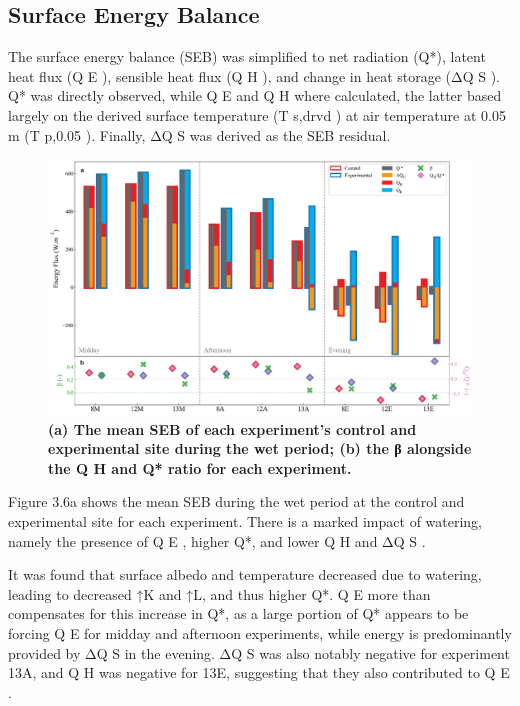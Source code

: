 \documentclass[final,3p,times,authoryear]{elsarticle}
\begin{document}
\subsection{Surface Energy Balance}\label{sec:discussion3.4}

The surface energy balance (SEB) was simplified to net radiation (Q*), latent heat flux
(Q E ), sensible heat flux (Q H ), and change in heat storage (ΔQ S ). Q* was directly
observed, while Q E and Q H where calculated, the latter based largely on the derived
surface temperature (T s,drvd ) at air temperature at 0.05 m (T p,0.05 ). Finally, ΔQ S was
derived as the SEB residual.

\begin{figure}
\centering
\includegraphics[trim={0 0 0 0},clip,scale=1.0]{pict017.png}
\caption{\bf (a) The mean SEB of each experiment’s control and experimental site during the wet period;
(b) the β alongside the Q H and Q* ratio for each experiment.}
 \label{fig:3.6}
\end{figure}

Figure 3.6a shows the mean SEB during the wet period at the control and experimental
site for each experiment. There is a marked impact of watering, namely the presence of
Q E , higher Q*, and lower Q H and ΔQ S .

It was found that surface albedo and temperature decreased due to watering, leading to
decreased ↑K and ↑L, and thus higher Q*. Q E more than compensates for this increase in
Q*, as a large portion of Q* appears to be forcing Q E for midday and afternoon
experiments, while energy is predominantly provided by ΔQ S in the evening. ΔQ S was
also notably negative for experiment 13A, and Q H was negative for 13E, suggesting that
they also contributed to Q E .
\end{document}
